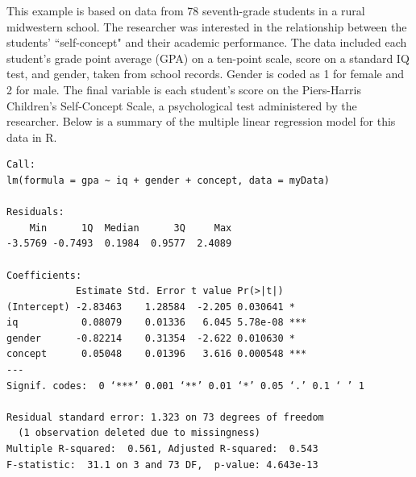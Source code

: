 \documentclass[11pt]{exam}
\begin{document}
\begin{questions}
\begin{parts}
\begin{solution}
\begin{tabular}{|l|c|c|c|c|}
\hline
\end{tabular}

\end{solution}

\vfill

\end{parts}


\question This example is based on data from 78 seventh-grade students in a rural midwestern school. The researcher was interested in the relationship between the students' ``self-concept" and their academic performance. The data included each student's grade point average (GPA) on a ten-point scale, score on a standard IQ test, and gender, taken from school records. Gender is coded as 1 for female and 2 for male. The final variable is each student's score on the Piers-Harris Children's Self-Concept Scale, a psychological test administered by the researcher. Below is a summary of the multiple linear regression model for this data in R. 


{\small
\begin{verbatim}
Call:
lm(formula = gpa ~ iq + gender + concept, data = myData)

Residuals:
    Min      1Q  Median      3Q     Max 
-3.5769 -0.7493  0.1984  0.9577  2.4089 

Coefficients:
            Estimate Std. Error t value Pr(>|t|)    
(Intercept) -2.83463    1.28584  -2.205 0.030641 *  
iq           0.08079    0.01336   6.045 5.78e-08 ***
gender      -0.82214    0.31354  -2.622 0.010630 *  
concept      0.05048    0.01396   3.616 0.000548 ***
---
Signif. codes:  0 ‘***’ 0.001 ‘**’ 0.01 ‘*’ 0.05 ‘.’ 0.1 ‘ ’ 1

Residual standard error: 1.323 on 73 degrees of freedom
  (1 observation deleted due to missingness)
Multiple R-squared:  0.561,	Adjusted R-squared:  0.543 
F-statistic:  31.1 on 3 and 73 DF,  p-value: 4.643e-13
\end{verbatim}}


\end{questions}
\end{document}
